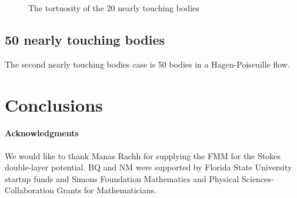\documentclass[preprint, 10pt]{elsarticle}
\begin{document}
\begin{figure}[H]
\begin{center}
\caption{The tortuosity of the 20 nearly touching bodies}
\end{center}
\end{figure}

\subsection{50 nearly touching bodies}
{\color{red}
The second nearly touching bodies case is 50 bodies in a Hagen-Poiseuille flow.
}
\section{Conclusions}
\label{s:conclusions}


\paragraph{\bf Acknowledgments} We would like to thank Manas Rachh for
supplying the FMM for the Stokes double-layer potential. BQ and NM were
supported by Florida State University startup funds and Simons
Foundation Mathematics and Physical Sciences-Collaboration Grants for
Mathematicians.

 

\end{document}
